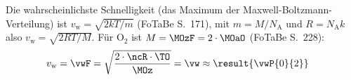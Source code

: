 Die wahrscheinlichste Schnelligkeit (das Maximum der Maxwell-Boltzmann-Verteilung) ist $v_\text{w} = \sqrt{2kT/m}$ (FoTaBe S.~171), mit $m = M/N_\text{A}$ und $R = N_\text{A}k$ also $v_\text{w} = \sqrt{2RT/M}$. Für $\mathrm{O_2}$ ist $M = \MOzF = 2\cdot\MOaO$ (FoTaBe S.~228):
\begin{align}
 v_\text{w} &= \vwF = \sqrt{\frac{2\cdot\ncR\cdot\TO}{\MOz}} = \vw \approx \result{\vwP{0}{2}}
\end{align}
